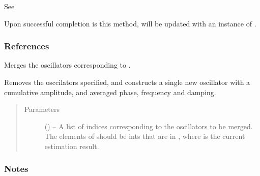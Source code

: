 \documentclass[letterpaper,10pt,english]{sphinxmanual}
\begin{document}
\begin{fulllineitems}
\begin{fulllineitems}
\begin{itemize}
\end{itemize}

\sphinxAtStartPar
{} See {\hyperref[\detokenize{references/core:nmrespy.core.Estimator._get_data_sw_offset}]{}}

\sphinxAtStartPar
Upon successful completion is this method,  will
be updated with an instance of {\hyperref[\detokenize{references/mpm:nmrespy.mpm.MatrixPencil}]{}}.
\subsubsection*{References}

\end{fulllineitems}


\begin{fulllineitems}
\label{\detokenize{references/core:nmrespy.core.Estimator.merge_oscillators}}
\sphinxAtStartPar
Merges the oscillators corresponding to .

\sphinxAtStartPar
Removes the osccilators specified, and constructs a single new
oscillator with a cumulative amplitude, and averaged phase,
frequency and damping.
\begin{quote}\begin{description}
\item[{Parameters}] \leavevmode
\sphinxAtStartPar
{} (\sphinxstyleliteralemphasis{\sphinxupquote{, }}) – A list of indices corresponding to the oscillators to be
merged. The elements of  should be ints that
are in , where  is the
current estimation result.

\end{description}\end{quote}
\subsubsection*{Notes}


\end{fulllineitems}
\end{fulllineitems}
\end{document}
